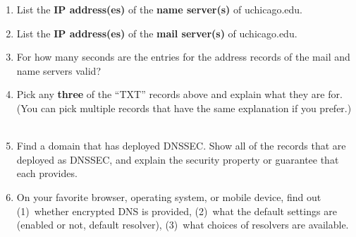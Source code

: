 \begin{enumerate}
    \item List the {\bf IP address(es)} of the {\bf name server(s)} of uchicago.edu.
~\ansbelow
\vspace{1in}


\item List the {\bf IP address(es)} of the {\bf mail server(s)} of uchicago.edu. 
~\ansbelow
\vspace{1in}


\item For how  many seconds are the  entries for the address  records of
the mail and name servers valid?
~\ansbelow
\vspace{1.15in}

\item Pick any {\bf three} of the ``TXT'' records above and explain what they are
for. (You can pick multiple records that have the same explanation if you
prefer.) 
~\ansbelow
\vspace{1.15in}


\item Find a domain that has deployed DNSSEC.  Show all of the records that
    are deployed as DNSSEC, and explain the security property or guarantee
    that each provides.
~\ansbelow
\vspace{1.15in}


\item On your favorite browser, operating system, or mobile device, find out
    (1)~whether encrypted DNS is provided, (2)~what the default settings are
    (enabled or not, default resolver), (3)~what choices of resolvers are
    available.
\end{enumerate}
\eprob
